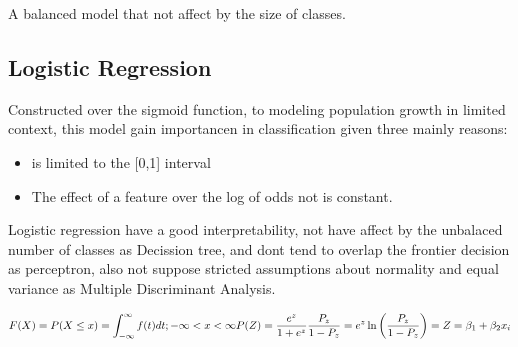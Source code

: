 \documentclass[10pt,a4paper]{article}
\begin{document}
A balanced model that not affect by the size of classes.


\subsection{Logistic Regression}
Constructed over the sigmoid function, to modeling population growth in limited context, this model gain importancen in classification given three mainly reasons:

\begin{itemize}


\item is limited to the  [0,1] interval

\item The effect of a feature over the log of odds not is constant.
\end{itemize}

Logistic regression have a good  interpretability, not have affect by the unbalaced number of classes as Decission tree, and dont tend to overlap the frontier decision as perceptron, also not suppose stricted assumptions about normality and equal variance as Multiple Discriminant Analysis.




\begin{equation*}

F(X)=P(X\leq x)= \int_{-\infty}^{\infty} f(t)dt ; -\infty<x<\infty \\


P(Z)= \dfrac{e^{z}}{1+e^{z}} \\

\dfrac{P_{z}}{1-P_{z}}=e^{z} \\

\ln\left(\dfrac{P_{z}}{1-P_{z}}\right)=Z= \beta_{1}+ \beta_{2}x_{i} \\

\end{equation*}
\end{document}
